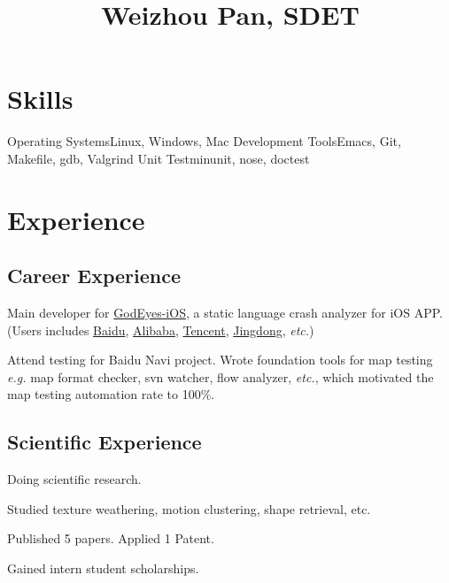 \documentclass[11pt,a4paper,nolmodern]{moderncv}
\title{Weizhou Pan, SDET}
\begin{document}
\setmainfont{Minion Pro}
\setsansfont{Myriad Pro}

\maketitle

\section{Skills}

           {Operating Systems}{Linux, Windows, Mac}
           {Development Tools}{Emacs, Git, Makefile, gdb, Valgrind}
           {Unit Test}{minunit, nose, doctest}

\section{Experience}

\subsection{Career Experience}

{
\begin{tightitemize}%
 \item Main developer for \href{http://godeyes.duapp.com}{GodEyes-iOS}, a static
   language crash analyzer for iOS APP. (Users includes \href{http://www.baidu.com}{Baidu\texttrademark},
   \href{http://www.taobao.com}{Alibaba\texttrademark}, \href{http://www.qq.com}{Tencent\texttrademark}, \href{http://jd.com}{Jingdong\texttrademark}, \textsl{etc.})
 \item Attend testing for Baidu Navi project. Wrote foundation tools for
   map testing \textsl{e.g.} map format checker, svn
   watcher, flow analyzer, \textsl{etc.}, which motivated
   the map testing automation rate to 100\%.
 \end{tightitemize}}

\subsection{Scientific Experience}

{Doing scientific research.
\begin{tightitemize}%
 \item Studied texture weathering, motion clustering, shape retrieval, etc.
 \item Published 5 papers. Applied 1 Patent.
 \item Gained intern student scholarships. 
 \end{tightitemize}}
\end{document}
